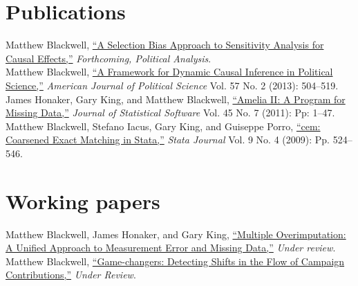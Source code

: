 \documentclass[margin,line]{res}
\newenvironment{list1}{
  \begin{list}{\ding{113}}{%
      \setlength{\itemsep}{0in}
      \setlength{\parsep}{0in} \setlength{\parskip}{0in}
      \setlength{\topsep}{0in} \setlength{\partopsep}{0in} 
      \setlength{\leftmargin}{0.83 cm}}}{\end{list}}
\begin{document}
\begin{resume}
\section{\sc Publications}
Matthew Blackwell, \href{http://gking.harvard.edu/files/sens.pdf}{``A Selection Bias Approach to Sensitivity
Analysis for Causal Effects,''} \emph{Forthcoming, Political Analysis}.\vspace{1em}\\
Matthew Blackwell,
\href{http://mattblackwell.org/files/papers/dynci.pdf}{``A Framework
  for Dynamic Causal Inference in Political Science,''}
\emph{American Journal of Political Science} Vol. 57 No. 2 (2013): 504--519.\vspace{1em}\\
James Honaker, Gary King, and Matthew Blackwell, \href{http://www.mattblackwell.org/files/papers/amelia-jss.pdf}{``Amelia II: A
Program for Missing Data,''} \emph{Journal of Statistical Software}
Vol. 45 No. 7 (2011): Pp: 1--47.
\vspace{1em}\\
Matthew Blackwell, Stefano Iacus, Gary King, and Guiseppe Porro, \href{http://www.mattblackwell.org/files/papers/cemStata.pdf}{``cem: Coarsened Exact Matching in Stata,''} \emph{Stata
  Journal} Vol. 9 No. 4 (2009): Pp. 524--546.

\section{\sc Working papers}

Matthew Blackwell, James Honaker, and Gary King, \href{http://gking.harvard.edu/files/measure.pdf}{``Multiple Overimputation: A Unified Approach to Measurement Error and
Missing Data,''} \emph{Under review}.\vspace{1em}\\
Matthew Blackwell, \href{http://www.mattblackwell.org/files/papers/gamechangers.pdf}{``Game-changers: Detecting Shifts in the Flow
  of Campaign Contributions,''} \emph{Under Review}. 


\end{resume}
\end{document}
